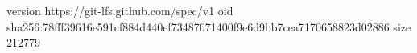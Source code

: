 version https://git-lfs.github.com/spec/v1
oid sha256:78fff39616e591cf884d440ef73487671400f9e6d9bb7cea7170658823d02886
size 212779
